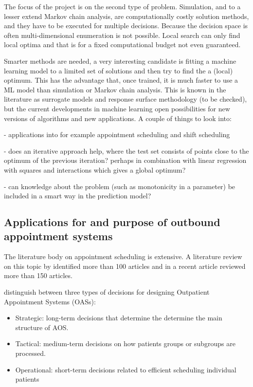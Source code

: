 \documentclass[
  10pt,
  letterpaper,
]{article}
\providecommand{\tightlist}{%
  \setlength{\itemsep}{0pt}\setlength{\parskip}{0pt}}\usepackage{longtable,booktabs,array}
\begin{document}
The focus of the project is on the second type of problem. Simulation,
and to a lesser extend Markov chain analysis, are computationally costly
solution methods, and they have to be executed for multiple decisions.
Because the decision space is often multi-dimensional enumeration is not
possible. Local search can only find local optima and that is for a
fixed computational budget not even guaranteed.

Smarter methods are needed, a very interesting candidate is fitting a
machine learning model to a limited set of solutions and then try to
find the a (local) optimum. This has the advantage that, once trained,
it is much faster to use a ML model than simulation or Markov chain
analysis. This is known in the literature as surrogate models and
response surface methodology (to be checked), but the current
developments in machine learning open possibilities for new versions of
algorithms and new applications. A couple of things to look into:

- applications into for example appointment scheduling and shift
scheduling

- does an iterative approach help, where the test set consists of points
close to the optimum of the previous iteration? perhaps in combination
with linear regression with squares and interactions which gives a
global optimum?

- can knowledge about the problem (such as monotonicity in a parameter)
be included in a smart way in the prediction model?

\hypertarget{applications-for-and-purpose-of-outbound-appointment-systems}{%
\subsection{Applications for and purpose of outbound appointment
systems}\label{applications-for-and-purpose-of-outbound-appointment-systems}}

The literature body on appointment scheduling is extensive. A literature
review on this topic by \citet{ahmadijavid_outpatient_2017} identified
more than 100 articles and in a recent article
\citet{ala_appointment_2022} reviewed more than 150 articles.

\citep{ahmadijavid_outpatient_2017} distinguish between three types of
decisions for designing Outpatient Appointment Systems (OASs):

\begin{itemize}
\tightlist
\item
  Strategic: long-term decisions that determine the determine the main
  structure of AOS.
\item
  Tactical: medium-term decisions on how patients groups or subgroups
  are processed.
\item
  Operational: short-term decisions related to efficient scheduling
  individual patients
\end{itemize}
\end{document}
